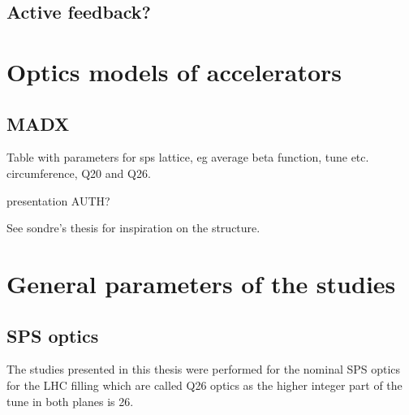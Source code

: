 \subsection{Active feedback?}
\section{Optics models of accelerators}
\subsection*{MADX}
Table with parameters for sps lattice, eg average beta function, tune etc. circumference, Q20 and Q26.

presentation AUTH?


See sondre's thesis for inspiration on the structure.
\section{General parameters of the studies}
\subsection{SPS optics}\label{subsec:SPS_optics_model}
 The studies presented in this thesis were performed for the nominal SPS optics for the LHC filling which are called Q26 optics as the higher integer part of the tune in both planes is 26. 

